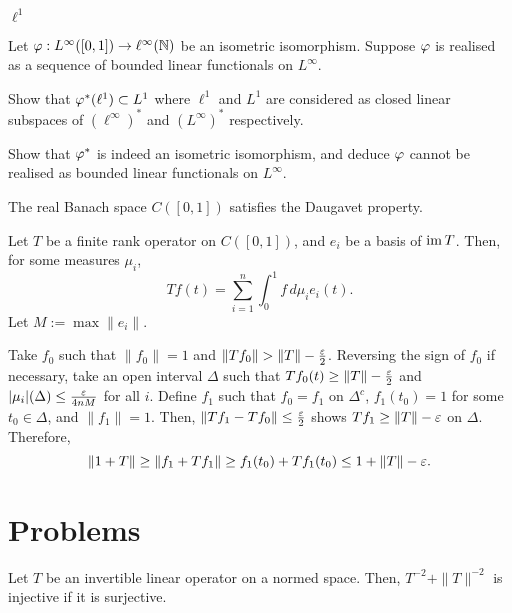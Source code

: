 \documentclass{../../large}
\begin{document}
\begin{prb}
$\ell^1$
\end{prb}

\begin{prb}
Let $\varphi:L^\infty([0,1])\to\ell^\infty(\mathbb{N})$ be an isometric isomorphism.
Suppose $\varphi$ is realised as a sequence of bounded linear functionals on $L^\infty$.
\begin{parts}
\item
Show that $\varphi^*(\ell^1)\subset L^1$ where $\ell^1$ and $L^1$ are considered as closed linear subspaces of $(\ell^\infty)^*$ and $(L^\infty)^*$ respectively.
\item Show that $\varphi^*$ is indeed an isometric isomorphism, and deduce $\varphi$ cannot be realised as bounded linear functionals on $L^\infty$.
\end{parts}
\end{prb}


\begin{prb}
\begin{parts}
\item The real Banach space $C([0,1])$ satisfies the Daugavet property.
\end{parts}
\end{prb}
\begin{pf}
Let $T$ be a finite rank operator on $C([0,1])$, and $e_i$ be a basis of $\operatorname{im} T$.
Then, for some measures $\mu_i$,
\[Tf(t)=\sum_{i=1}^n\int_0^1f\,d\mu_ie_i(t).\]
Let $M:=\max\|e_i\|$.

Take $f_0$ such that $\|f_0\|=1$ and $\|Tf_0\|>\|T\|-\frac\e2$.
Reversing the sign of $f_0$ if necessary, take an open interval $\Delta$ such that $Tf_0(t)\ge\|T\|-\frac{\varepsilon}2$ and $|\mu_i|(\Delta)\le\frac{\varepsilon}{4nM}$ for all $i$.
Define $f_1$ such that $f_0=f_1$ on $\Delta^c$, $f_1(t_0)=1$ for some $t_0\in\Delta$, and $\|f_1\|=1$.
Then, $\|Tf_1-Tf_0\|\le\frac{\varepsilon}2$ shows $Tf_1\ge\|T\|-\varepsilon$ on $\Delta$.
Therefore,
\[\|1+T\|\ge\|f_1+Tf_1\|\ge f_1(t_0)+Tf_1(t_0)\le1+\|T\|-\varepsilon.\]
\end{pf}


\section*{Problems}
\begin{prb}
Let $T$ be an invertible linear operator on a normed space.
Then, $T^{-2}+\|T\|^{-2}$ is injective if it is surjective.
\end{prb}
\end{document}
